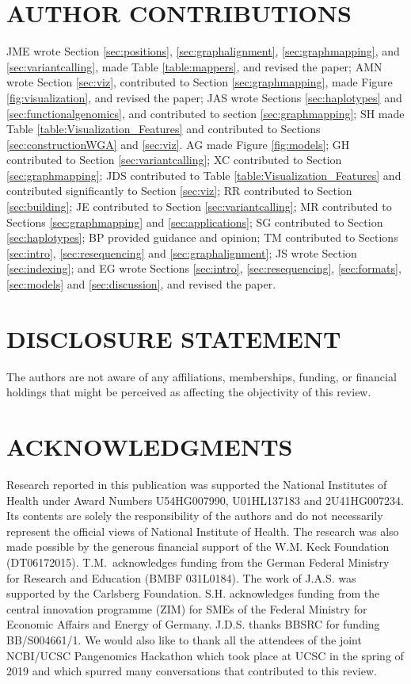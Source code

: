 

\section*{AUTHOR CONTRIBUTIONS}

JME wrote Section \ref{sec:positions}, \ref{sec:graphalignment}, \ref{sec:graphmapping}, and \ref{sec:variantcalling}, made Table \ref{table:mappers}, and revised the paper;
AMN wrote Section \ref{sec:viz}, contributed to Section \ref{sec:graphmapping}, made Figure \ref{fig:visualization}, and revised the paper;
JAS wrote Sections \ref{sec:haplotypes} and \ref{sec:functionalgenomics}, and contributed to section \ref{sec:graphmapping};
SH made Table \ref{table:Visualization_Features} and contributed to Sections \ref{sec:constructionWGA} and \ref{sec:viz}.
AG made Figure \ref{fig:models};
GH contributed to Section \ref{sec:variantcalling};
XC contributed to Section \ref{sec:graphmapping};
JDS contributed to Table \ref{table:Visualization_Features} and contributed significantly to Section \ref{sec:viz};
RR contributed to Section \ref{sec:building};
JE contributed to Section \ref{sec:variantcalling};
MR contributed to Sections \ref{sec:graphmapping} and \ref{sec:applications};
SG contributed to Section \ref{sec:haplotypes};
BP provided guidance and opinion;
TM contributed to Sections  \ref{sec:intro}, \ref{sec:resequencing} and \ref{sec:graphalignment};
JS wrote Section \ref{sec:indexing};
and EG wrote Sections \ref{sec:intro}, \ref{sec:resequencing}, \ref{sec:formats}, \ref{sec:models} and \ref{sec:discussion}, and revised the paper.

\section*{DISCLOSURE STATEMENT}
The authors are not aware of any affiliations, memberships, funding, or financial holdings that
might be perceived as affecting the objectivity of this review. 

\section*{ACKNOWLEDGMENTS}
Research reported in this publication was supported the National Institutes of Health under Award Numbers U54HG007990, U01HL137183 and 2U41HG007234.
Its contents are solely the responsibility of the authors and do not necessarily represent the official views of National Institute of Health.
The research was also made possible by the generous financial support of the W.M. Keck Foundation (DT06172015).
T.M.\ acknowledges funding from the German Federal Ministry for Research and Education (BMBF 031L0184).
The work of J.A.S. was supported by the Carlsberg Foundation.
S.H. acknowledges funding from the central innovation programme (ZIM) for SMEs of the Federal Ministry for Economic Affairs and Energy of Germany.
J.D.S. thanks BBSRC for funding BB/S004661/1.
We would also like to thank all the attendees of the joint NCBI/UCSC Pangenomics Hackathon which took place at UCSC in the spring of 2019 and which spurred many conversations that contributed to this review.
